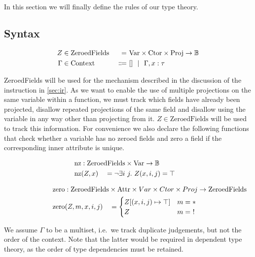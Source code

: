 In this section we will finally define the rules of our type theory.

\subsection{Syntax}

\newcommand{\ZeroedFields}{\mathrm{ZeroedFields}}
\newcommand{\Context}{\mathrm{Context}}

\begin{alignat*}{3}
	Z &\in \ZeroedFields\ &=&\ \Var \times \Ctor \times \Proj \to \mathbb{B} \\
	\Gamma &\in \Context  &\Coloneqq&\ [] \sep \Gamma, x : \tau
\end{alignat*}

ZeroedFields will be used for the mechanism described in the discussion of the  instruction in \cref{sec:ir}. As we want to enable the use of multiple projections on the same variable within a function, we must track which fields have already been projected, disallow repeated projections of the same field and disallow using the variable in any way other than projecting from it. $Z \in \ZeroedFields$ will be used to track this information. For convenience we also declare the following functions that check whether a variable has no zeroed fields and zero a field if the corresponding inner attribute is unique. 

\newcommand{\nz}{\mathrm{nz}}

\begin{alignat*}{3}
	\nz &: \mathrlap{\ZeroedFields \times \Var \to \mathbb{B}} \\
	\nz&(Z, x) &&= \lnot \exists i\ j.\ Z(x, i, j) = \top
\end{alignat*}

\newcommand{\zeroo}{\mathrm{zero}}

\begin{alignat*}{3}
	\zeroo &: \mathrlap{\ZeroedFields \times \Attr \times Var \times Ctor \times Proj \to \ZeroedFields} \\
	\zeroo&(Z, m, x, i, j) &&= \begin{cases}
		Z[(x, i, j) \mapsto \top] & m = * \\
		Z & m =\ !
	\end{cases}
\end{alignat*}

We assume $\Gamma$ to be a multiset, i.e.\ we track duplicate judgements, but not the order of the context. Note that the latter would be required in dependent type theory, as the order of type dependencies must be retained.

